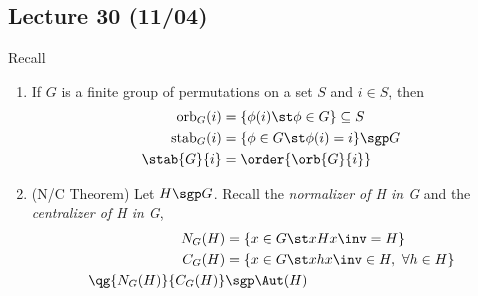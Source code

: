 \subsection*{Lecture 30 (11/04)} %

Recall
\begin{enumerate}
    \item If \(G\) is a finite group of permutations on a set \(S\) and \(i\in S\), then \begin{align*}
        \text{orb}_G(i) &= \{\phi(i)\st \phi\in G\} \subseteq S\\
        \text{stab}_G(i) &= \{\phi\in G\st \phi(i) = i\} \sgp G \\
        \index{G}{\stab{G}{i}} &= \order{\orb{G}{i}}
    \end{align*}
    \item (N/C Theorem) Let \(H\sgp G\). Recall the \emph{normalizer of H in G} and the \emph{centralizer of H in G}, \begin{align*}
        N_G(H)&=\{x\in G \st xHx\inv=H\} \\
        C_G(H)&=\{x\in G \st xhx\inv \in H,\ \forall h\in H\} \\
        \qg{N_G(H)}{C_G(H)}&\sgp \Aut(H)
    \end{align*}
\end{enumerate}

